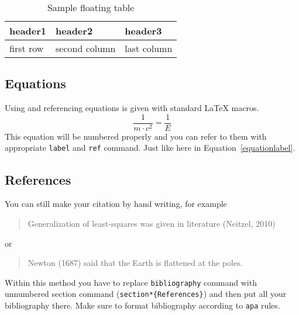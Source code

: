 \documentclass{rgg}
\begin{document}
    \begin{table}[b]
      \caption{Sample floating table}
      \label{labelforgloatingtable}
      \begin{tabular}{@{}lll@{}}
        \toprule
        header1 & header2 & header3 \\
        \midrule
        first row  & second column & last column \\
        \bottomrule
      \end{tabular}
    \end{table}

  \subsection{Equations}
    Using and referencing equations 
    is given with standard \LaTeX{} macros.
    \begin{equation}
      \frac{1}{m\cdot c^2} = \frac{1}{E}
      \label{equationlabel}
    \end{equation}
    This equation will be numbered properly and you
    can refer to them with appropriate
    \texttt{label} and \texttt{ref} command.
    Just like here in Equation~\ref{equationlabel}.

  \subsection{References}
    You can still make your citation by hand writing, for example
    \begin{quotation}
      Generalization of least-squares was given in literature (Neitzel, 2010)
    \end{quotation}
    or 
    \begin{quotation}
      Newton (1687) said that the Earth is flattened at the poles. 
    \end{quotation}
    Within this method you have to replace \texttt{bibliography}
    command with unnumbered section command (\texttt{section*\{References\}})
    and then put all your bibliography there. Make sure to format bibliography
    according to \texttt{apa} rules.
\end{document}
